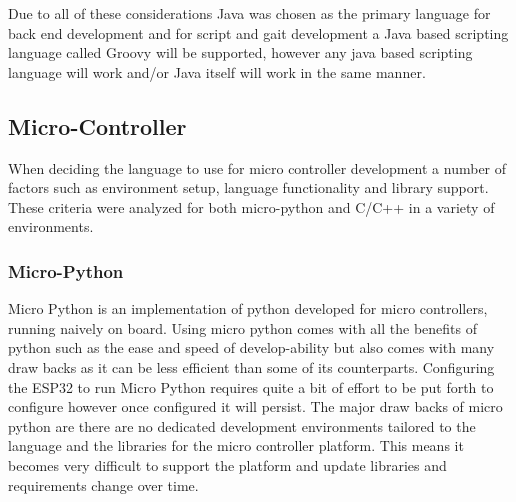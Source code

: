 \documentclass[12pt]{report}
\begin{document}
Due to all of these considerations Java was chosen as the primary language for back end development and for script and gait development a Java based scripting language called Groovy will be supported, however any java based scripting language will work and/or Java itself will work in the same manner. \newline

\subsection{Micro-Controller}
When deciding the language to use for micro controller development a number of factors such as environment setup, language functionality and library support. These criteria were analyzed for both micro-python and C/C++ in a variety of environments. 
\subsubsection{Micro-Python}
    Micro Python is an implementation of python developed for micro controllers, running naively on board. Using micro python comes with all the benefits of python such as the ease and speed of develop-ability but also comes with many draw backs as it can be less efficient than some of its counterparts. Configuring the ESP32 to run Micro Python requires quite a bit of effort to be put forth to configure however once configured it will persist. The major draw backs of micro python are there are no dedicated development environments tailored to the language and the libraries for the micro controller platform. This means it becomes very difficult to support the platform and update libraries and requirements change over time.
\end{document}
